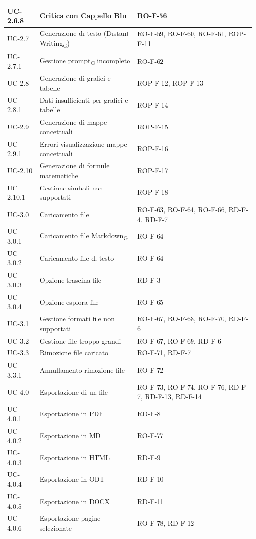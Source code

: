 \documentclass[11pt,a4paper]{article}
\newcommand{\gls}[1]{#1\textsubscript{G}}
\begin{document}
\begin{longtable}{|p{}|p{}|>{\raggedright\arraybackslash}p{}|}
\hline
UC-2.6.8 & Critica con Cappello Blu & RO-F-56 \\
\hline
UC-2.7 & Generazione di testo (\gls{Distant Writing}) & RO-F-59, RO-F-60, RO-F-61, ROP-F-11 \\
\hline
UC-2.7.1 & Gestione \gls{prompt} incompleto & RO-F-62 \\
\hline
UC-2.8 & Generazione di grafici e tabelle & ROP-F-12, ROP-F-13 \\
\hline
UC-2.8.1 & Dati insufficienti per grafici e tabelle & ROP-F-14 \\
\hline
UC-2.9 & Generazione di mappe concettuali & ROP-F-15 \\
\hline
UC-2.9.1 & Errori visualizzazione mappe concettuali & ROP-F-16 \\
\hline
UC-2.10 & Generazione di formule matematiche & ROP-F-17 \\
\hline
UC-2.10.1 & Gestione simboli non supportati & ROP-F-18 \\
\hline
UC-3.0 & Caricamento file & RO-F-63, RO-F-64, RO-F-66, RD-F-4, RD-F-7 \\
\hline
UC-3.0.1 & Caricamento file \gls{Markdown} & RO-F-64 \\
\hline
UC-3.0.2 & Caricamento file di testo & RO-F-64 \\
\hline
UC-3.0.3 & Opzione trascina file & RD-F-3 \\
\hline
UC-3.0.4 & Opzione esplora file & RO-F-65 \\
\hline
UC-3.1 & Gestione formati file non supportati & RO-F-67, RO-F-68, RO-F-70, RD-F-6 \\
\hline
UC-3.2 & Gestione file troppo grandi & RO-F-67, RO-F-69, RD-F-6 \\
\hline
UC-3.3 & Rimozione file caricato & RO-F-71, RD-F-7 \\
\hline
UC-3.3.1 & Annullamento rimozione file & RO-F-72 \\
\hline
UC-4.0 & Esportazione di un file & RO-F-73, RO-F-74, RO-F-76, RD-F-7, RD-F-13, RD-F-14 \\
\hline
UC-4.0.1 & Esportazione in PDF & RD-F-8 \\
\hline
UC-4.0.2 & Esportazione in MD & RO-F-77 \\
\hline
UC-4.0.3 & Esportazione in HTML & RD-F-9 \\
\hline
UC-4.0.4 & Esportazione in ODT & RD-F-10 \\
\hline
UC-4.0.5 & Esportazione in DOCX & RD-F-11 \\
\hline
UC-4.0.6 & Esportazione pagine selezionate & RO-F-78, RD-F-12 \\

\end{longtable}
\end{document}
